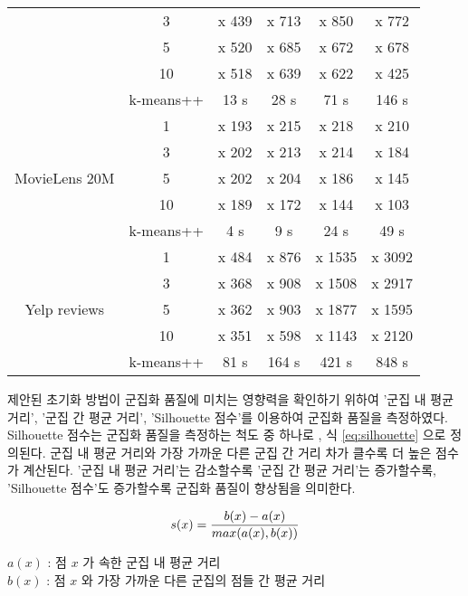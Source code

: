 \documentclass[oneside, ko,phd]{snuthesis_utf8_kor}
\begin{document}
\begin{table}[H]
\begin{tabular}{|c|c|c|c|c|c|}
 & 3 & x 439 & x 713 & x 850 & x 772 \\ \cline{2-6} 
 & 5 & x 520 & x 685 & x 672 & x 678 \\ \cline{2-6} 
 & 10 & x 518 & x 639 & x 622 & x 425 \\ \cline{2-6} 
 & k-means++ & 13 s & 28 s & 71 s & 146 s \\ \hline
\multirow{5}{*}{MovieLens 20M} & 1 & x 193 & x 215 & x 218 & x 210 \\ \cline{2-6} 
 & 3 & x 202 & x 213 & x 214 & x 184 \\ \cline{2-6} 
 & 5 & x 202 & x 204 & x 186 & x 145 \\ \cline{2-6} 
 & 10 & x 189 & x 172 & x 144 & x 103 \\ \cline{2-6} 
 & k-means++ & 4 s & 9 s & 24 s & 49 s \\ \hline
\multirow{5}{*}{Yelp reviews} & 1 & x 484 & x 876 & x 1535 & x 3092 \\ \cline{2-6} 
 & 3 & x 368 & x 908 & x 1508 & x 2917 \\ \cline{2-6} 
 & 5 & x 362 & x 903 & x 1877 & x 1595 \\ \cline{2-6} 
 & 10 & x 351 & x 598 & x 1143 & x 2120 \\ \cline{2-6} 
 & k-means++ & 81 s & 164 s & 421 s & 848 s \\ \hline
\end{tabular}
\end{table}

제안된 초기화 방법이 군집화 품질에 미치는 영향력을 확인하기 위하여 '군집 내 평균 거리', '군집 간 평균 거리', 'Silhouette 점수'를 이용하여 군집화 품질을 측정하였다.
Silhouette 점수는 군집화 품질을 측정하는 척도 중 하나로 \cite{rousseeuw1987silhouettes, lewis2012human}, 식 \ref{eq:silhouette} 으로 정의된다.
군집 내 평균 거리와 가장 가까운 다른 군집 간 거리 차가 클수록 더 높은 점수가 계산된다.
'군집 내 평균 거리'는 감소할수록 '군집 간 평균 거리'는 증가할수록, 'Silhouette 점수'도 증가할수록 군집화 품질이 향상됨을 의미한다.

\begin{equation}
\label{eq:silhouette}
\centering
s(x) = \frac{b(x) - a(x)}{max(a(x), b(x))}
\end{equation}

\begin{flushleft}
$a(x)$ : 점 $x$ 가 속한 군집 내 평균 거리 \\
$b(x)$ : 점 $x$ 와 가장 가까운 다른 군집의 점들 간 평균 거리 \\
\end{flushleft}
\end{document}
